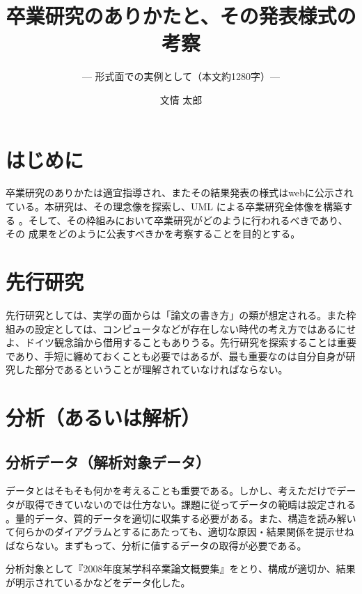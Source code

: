 \documentclass[twoside,uplatex]{ujarticle}
\title{卒業研究のありかたと、その発表様式の考察}
\subtitle{--- 形式面での実例として（本文約1280字）---}
\author{文情 太郎}
\begin{document}
\maketitle
\nocite{*}

\section{はじめに}
卒業研究のありかたは適宜指導され、またその結果発表の様式はwebに公示され
ている。本研究は、その理念像を探索し、UML による卒業研究全体像を構築する
。そして、その枠組みにおいて卒業研究がどのように行われるべきであり、その
成果をどのように公表すべきかを考察することを目的とする。


\section{先行研究}
先行研究としては、実学の面からは「論文の書き方」の類が想定される。また枠
組みの設定としては、コンピュータなどが存在しない時代の考え方ではあるにせ
よ、ドイツ観念論から借用することもありうる。先行研究を探索することは重要
であり、手短に纏めておくことも必要ではあるが、最も重要なのは自分自身が研
究した部分であるということが理解されていなければならない。


\section{分析（あるいは解析）}
\subsection{分析データ（解析対象データ）}
データとはそもそも何かを考えることも重要である。しかし、考えただけでデー
タが取得できていないのでは仕方ない。課題に従ってデータの範疇は設定される
。量的データ、質的データを適切に収集する必要がある。また、構造を読み解い
て何らかのダイアグラムとするにあたっても、適切な原因・結果関係を提示せね
ばならない。まずもって、分析に値するデータの取得が必要である。

分析対象として『2008年度某学科卒業論文概要集』をとり、構成が適切か、結果
が明示されているかなどをデータ化した。
\end{document}
